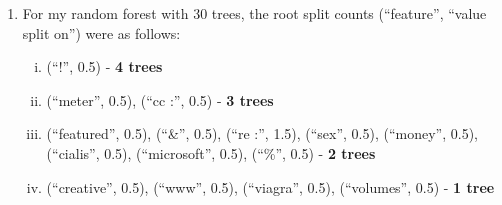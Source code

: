 \documentclass{article}
\begin{document}
\begin{enumerate}
   \item For my random forest with 30 trees, the root split counts (``feature'', ``value split on'') were as follows:
     \begin{enumerate}[i.]
       \item (``!'', 0.5) - \textbf{4 trees}
       \item (``meter'', 0.5), (``cc :'', 0.5) - \textbf{3 trees}
       \item (``featured'', 0.5), (``\&'', 0.5), (``re :'', 1.5), (``sex'', 0.5), (``money'', 0.5), (``cialis'', 0.5), (``microsoft'', 0.5), (``\%'', 0.5) - \textbf{2 trees}
       \item (``creative'', 0.5), (``www'', 0.5), (``viagra'', 0.5), (``volumes'', 0.5) - \textbf{1 tree}
     \end{enumerate}

\end{enumerate}
\end{document}
